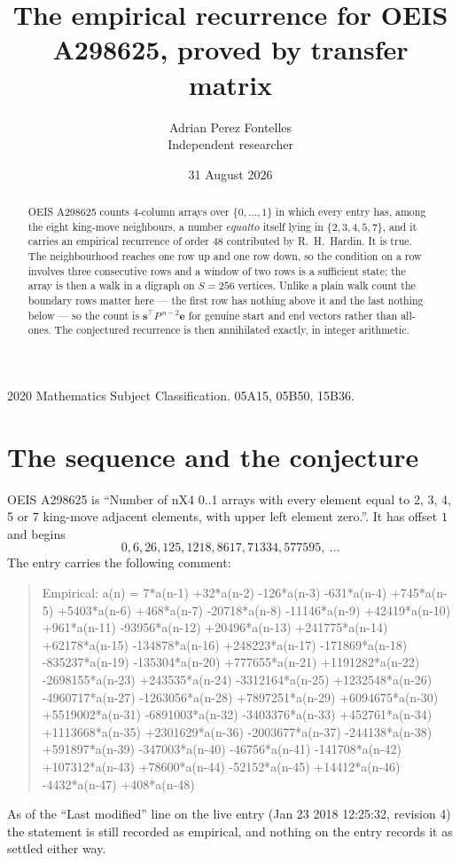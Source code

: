 \documentclass[11pt,a4paper]{article}
\title{The empirical recurrence for OEIS A298625, proved by transfer matrix}
\author{Adrian Perez Fontelles\\ \small Independent researcher}
\date{31 August 2026}
\theoremstyle{plain}
\theoremstyle{definition}
\begin{document}
\maketitle

\begin{abstract}
OEIS A298625 counts $4$-column arrays over $\{0,\dots,1\}$ in which every entry has,
among the eight king-move neighbours, a number $equal to$ itself lying in $\{2,3,4,5,7\}$, and it carries an empirical
recurrence of order $48$ contributed by R.~H.~Hardin. It is true. The neighbourhood
reaches one row up and one row down, so the condition on a row involves three consecutive
rows and a window of two rows is a sufficient state; the array is then a walk in a digraph
on $S=256$ vertices. Unlike a plain walk count the boundary rows matter here --- the first
row has nothing above it and the last nothing below --- so the count is
$\mathbf{s}^{\!\top}P^{\,n-2}\mathbf{e}$ for genuine start and end vectors rather than
all-ones. The conjectured recurrence is then annihilated exactly, in integer arithmetic.
\end{abstract}

\noindent\small 2020 Mathematics Subject Classification. 05A15, 05B50, 15B36.\normalsize

\section{The sequence and the conjecture}

OEIS A298625 is ``Number of nX4 0..1 arrays with every element equal to 2, 3, 4, 5 or 7 king-move adjacent elements, with upper left element zero.''. It has offset
$1$ and begins
\[
0, 6, 26, 125, 1218, 8617, 71334, 577595,\ \dots
\]
The entry carries the following comment:
\begin{quote}\small
Empirical: a(n) = 7*a(n-1) +32*a(n-2) -126*a(n-3) -631*a(n-4) +745*a(n-5) +5403*a(n-6) +468*a(n-7) -20718*a(n-8) -11146*a(n-9) +42419*a(n-10) +961*a(n-11) -93956*a(n-12) +20496*a(n-13) +241775*a(n-14) +62178*a(n-15) -134878*a(n-16) +248223*a(n-17) -171869*a(n-18) -835237*a(n-19) -135304*a(n-20) +777655*a(n-21) +1191282*a(n-22) -2698155*a(n-23) +243535*a(n-24) -3312164*a(n-25) +1232548*a(n-26) -4960717*a(n-27) -1263056*a(n-28) +7897251*a(n-29) +6094675*a(n-30) +5519002*a(n-31) -6891003*a(n-32) -3403376*a(n-33) +452761*a(n-34) +1113668*a(n-35) +2301629*a(n-36) -2003677*a(n-37) -244138*a(n-38) +591897*a(n-39) -347003*a(n-40) -46756*a(n-41) -141708*a(n-42) +107312*a(n-43) +78600*a(n-44) -52152*a(n-45) +14412*a(n-46) -4432*a(n-47) +408*a(n-48)
\end{quote}
As of the ``Last modified'' line on the live entry (Jan 23 2018 12:25:32, revision
4) the statement is still recorded as empirical, and nothing on the entry
records it as settled either way.
\end{document}
